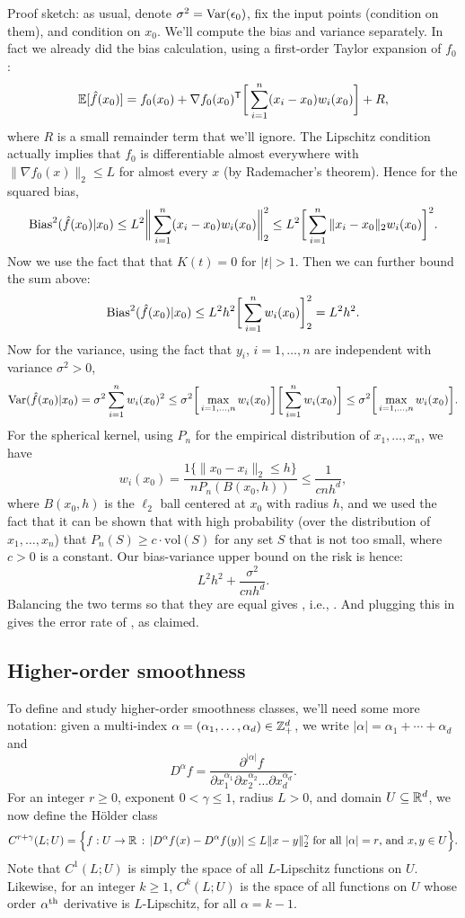 \documentclass{article}
\begin{document}
Proof sketch: as usual, denote $\sigma^2 = \mathrm{Var}(\epsilon_0)$, fix the input
points (condition on them), and condition on $x_0$. We'll compute the bias and
variance separately. In fact we already did the bias calculation, using a
first-order Taylor expansion of $f_0$: 
\[
\mathbb{E}[\hat{f}(x_0)] = f_0(x_0) + \nabla f_0(x_0)^{\mathsf{T}} \bigg[\sum_{i=1}^n (x_i-x_0)
w_i(x_0) \bigg] + R,  
\]
where $R$ is a small remainder term that we'll ignore. The Lipschitz condition
actually implies that $f_0$ is differentiable almost everywhere with $\|\nabla 
f_0(x)\|_2 \leq L$ for almost every $x$ (by Rademacher's theorem). Hence for the
squared bias,  
\[
\mathrm{Bias}^2(\hat{f}(x_0) | x_0) 
\leq L^2 \bigg\| \sum_{i=1}^n (x_i-x_0) w_i(x_0) \bigg\|_2^2 
\leq L^2 \bigg[ \sum_{i=1}^n \|x_i-x_0\|_2 w_i(x_0) \bigg]^2.
\]
Now we use the fact that that $K(t) = 0$ for $|t| > 1$. Then we can further
bound the sum above: 
\[
\mathrm{Bias}^2(\hat{f}(x_0) | x_0) 
\leq L^2 h^2 \bigg[ \sum_{i=1}^n w_i(x_0) \bigg]_2^2
= L^2 h^2.
\]
Now for the variance, using the fact that $y_i$, $i=1,\dots,n$ are independent
with variance $\sigma^2>0$,
\[
\mathrm{Var}(\hat{f}(x_0) | x_0) 
= \sigma^2 \sum_{i=1}^n w_i(x_0)^2 
\leq \sigma^2 \bigg[ \max_{i=1,\dots,n} w_i(x_0) \bigg] 
\bigg[ \sum_{i=1}^n w_i(x_0) \bigg]  
\leq \sigma^2 \bigg[ \max_{i=1,\dots,n} w_i(x_0) \bigg].
\]
For the spherical kernel, using $P_n$ for the empirical distribution of
$x_1,\dots,x_n$, we have  
\[
w_i(x_0) = \frac{1\{ \|x_0-x_i\|_2 \leq h \}}{n P_n(B(x_0, h)) } \leq
\frac{1}{cnh^d},
\]
where $B(x_0,h)$ is the $\ell_2$ ball centered at $x_0$ with radius $h$, and we
used the fact that it can be shown that with high probability (over the
distribution of $x_1,\dots,x_n$) that $P_n(S) \geq c \cdot \mathrm{vol}(S)$ for
any set $S$ that is not too small, where $c>0$ is a constant. Our bias-variance
upper bound on the risk is hence:
\[
L^2 h^2 + \frac{\sigma^2}{cnh^d}.
\]
Balancing the two terms so that they are equal gives , i.e., . And plugging this in gives
the error rate of , as claimed.   

\subsection{Higher-order smoothness}

To define and study higher-order smoothness classes, we'll need some more
notation: given a multi-index $\alpha=(\alpha_1,\dots,\alpha_d) \in \mathbb{Z}^d_+$, we
write $|\alpha| = \alpha_1 + \cdots + \alpha_d$ and 
\[
D^\alpha f = \frac{\partial^{|\alpha|} f}{\partial x_1^{\alpha_1} \partial
  x_2^{\alpha_2} \dots \partial x_d^{\alpha_d}}.
\]
For an integer $r \geq 0$, exponent $0 < \gamma \leq 1$, radius $L>0$, and
domain $U \subseteq \mathbb{R}^d$, we now define the H{\"o}lder class  
\[
C^{r+\gamma}(L; U) = \Big\{ f : U \to \mathbb{R} \,:\, | D^\alpha f (x) - D^\alpha f(y)
| \leq L \|x-y\|_2^\gamma \; \text{for all $|\alpha| = r$, and $x,y \in U$}
\Big\}.   
\]
Note that $C^1(L; U)$ is simply the space of all $L$-Lipschitz functions on
$U$. Likewise, for an integer $k \geq 1$, $C^k(L; U)$ is the space of all
functions on $U$ whose order $\alpha^{\text{th}}$ derivative is $L$-Lipschitz, for all
$\alpha = k-1$.
\end{document}

